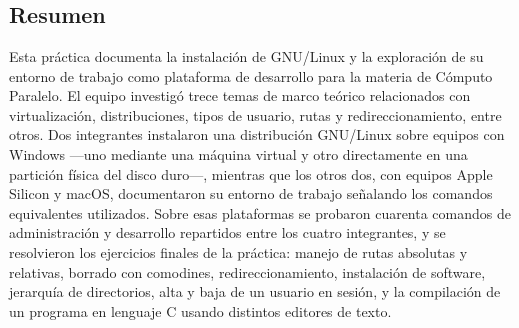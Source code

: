 %
%
%
%

\chapter{\TituloPracUno}
\label{prac:01}

\section{Resumen}
\label{sec:prac01:resumen}

Esta práctica documenta la instalación de GNU/Linux y la exploración de su entorno de trabajo como plataforma de desarrollo para la materia de Cómputo Paralelo. El equipo investigó trece temas de marco teórico relacionados con virtualización, distribuciones, tipos de usuario, rutas y redireccionamiento, entre otros. Dos integrantes instalaron una distribución GNU/Linux sobre equipos con Windows —uno mediante una máquina virtual y otro directamente en una partición física del disco duro—, mientras que los otros dos, con equipos Apple Silicon y macOS, documentaron su entorno de trabajo señalando los comandos equivalentes utilizados. Sobre esas plataformas se probaron cuarenta comandos de administración y desarrollo repartidos entre los cuatro integrantes, y se resolvieron los ejercicios finales de la práctica: manejo de rutas absolutas y relativas, borrado con comodines, redireccionamiento, instalación de software, jerarquía de directorios, alta y baja de un usuario en sesión, y la compilación de un programa en lenguaje C usando distintos editores de texto.

